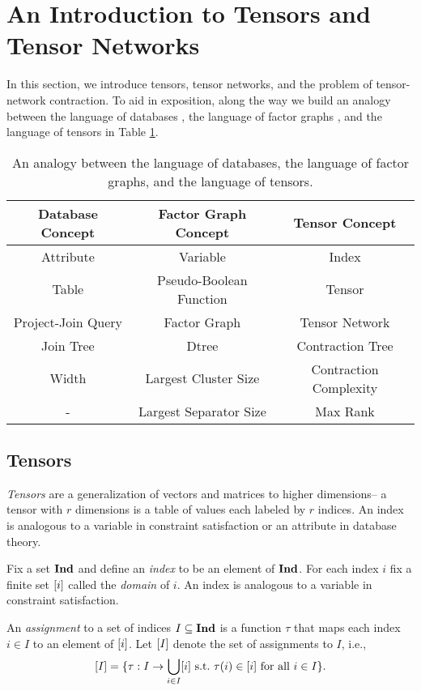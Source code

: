 \section{An Introduction to Tensors and Tensor Networks}
\label{sec:tensors:tensors}
In this section, we introduce tensors, tensor networks, and the problem of tensor-network contraction. To aid in exposition, along the way we build an analogy between the language of databases \cite{SG88}, the language of factor graphs \cite{KFL01,dechter99,darwiche01b}, and the language of tensors in Table \ref{table:db-tensor-analogy}.

\begin{table}[t]
\centering
\begin{tabular}{c|c|c}
\hline
\textbf{Database Concept} & \textbf{Factor Graph Concept} & \textbf{Tensor Concept}\\ \hline
Attribute & Variable & Index\\
Table & Pseudo-Boolean Function & Tensor\\
Project-Join Query & Factor Graph & Tensor Network\\
Join Tree & Dtree & Contraction Tree\\ 
Width & Largest Cluster Size & Contraction Complexity \\
- & Largest Separator Size & Max Rank \\ \hline
\end{tabular}
\caption{\label{table:db-tensor-analogy} An analogy between the language of databases, the language of factor graphs, and the language of tensors.}
\end{table}

\subsection{Tensors}
\emph{Tensors} are a generalization of vectors and matrices to higher dimensions-- a tensor with $r$ dimensions is a table of values each labeled by $r$ indices. An index is analogous to a variable in constraint satisfaction or an attribute in database theory. 

Fix a set $\mathbf{Ind}$ and define an \emph{index} to be an element of $\mathbf{Ind}$. For each index $i$ fix a finite set $[i]$ called the \emph{domain} of $i$. An index is analogous to a variable in constraint satisfaction. %

An \emph{assignment} to a set of indices $I \subseteq \mathbf{Ind}$ is a function $\tau$ that maps each index $i \in I$ to an element of $[i]$. Let $[I]$ denote the set of assignments to $I$, i.e., $$[I] = \{\tau: I \rightarrow \bigcup_{i \in I} [i]~\text{s.t.}~\tau(i) \in [i]~\text{for all}~i \in I\}.$$

